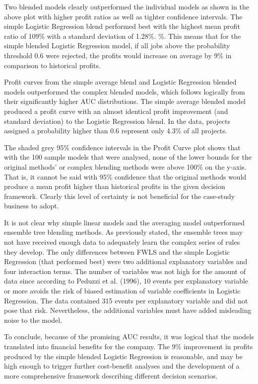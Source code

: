 \documentclass[]{elsarticle} %
\begin{document}
Two blended models clearly outperformed the individual models as shown
in the above plot with higher profit ratios as well as tighter
confidence intervals. The simple Logistic Regression blend performed
best with the highest mean profit ratio of 109\% with a standard
deviation of 1.28\%. \%. This means that for the simple blended Logistic
Regression model, if all jobs above the probability threshold 0.6 were
rejected, the profits would increase on average by 9\% in comparison to
historical profits.

Profit curves from the simple average blend and Logistic Regression
blended models outperformed the complex blended models, which follows
logically from their significantly higher AUC distributions. The simple
average blended model produced a profit curve with an almost identical
profit improvement (and standard deviation) to the Logistic Regression
blend. In the data, projects assigned a probability higher than 0.6
represent only 4.3\% of all projects.

The shaded grey 95\% confidence intervals in the Profit Curve plot shows
that with the 100 sample models that were analysed, none of the lower
bounds for the original methods' or complex blending methods were above
100\% on the y-axis. That is, it cannot be said with 95\% confidence
that the original methods would produce a mean profit higher than
historical profits in the given decision framework. Clearly this level
of certainty is not beneficial for the case-study business to adopt.

It is not clear why simple linear models and the averaging model
outperformed ensemble tree blending methods. As previously stated, the
ensemble trees may not have received enough data to adequately learn the
complex series of rules they develop. The only differences between FWLS
and the simple Logistic Regression (that performed best) were two
additional explanatory variables and four interaction terms. The number
of variables was not high for the amount of data since according to
Peduzzi et al. (1996), 10 events per explanatory variable or more avoids
the risk of biased estimation of variable coefficients in Logistic
Regression. The data contained 315 events per explanatory variable and
did not pose that risk. Nevertheless, the additional variables must have
added misleading noise to the model.

To conclude, because of the promising AUC results, it was logical that
the models translated into financial benefits for the company. The 9\%
improvement in profits produced by the simple blended Logistic
Regression is reasonable, and may be high enough to trigger further
cost-benefit analyses and the development of a more comprehensive
framework describing different decision scenarios.
\end{document}

